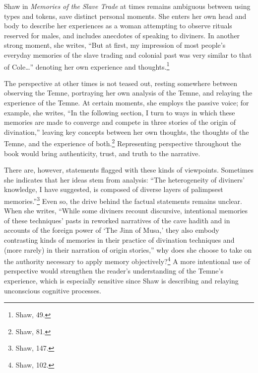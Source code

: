 Shaw in \emph{Memories of the Slave Trade} at times remains ambiguous
between using types and tokens, save distinct personal moments. She
enters her own head and body to describe her experiences as a woman
attempting to observe rituals reserved for males, and includes anecdotes
of speaking to diviners. In another strong moment, she writes, ``But at
first, my impression of most people's everyday memories of the slave
trading and colonial past was very similar to that of Cole\ldots''
denoting her own experience and thoughts.\footnote{Shaw, 49.}

The perspective at other times is not teased out, resting somewhere
between observing the Temne, portraying her own analysis of the Temne,
and relaying the experience of the Temne. At certain moments, she
employs the passive voice; for example, she writes, ``In the following
section, I turn to ways in which these memories are made to converge and
compete in three stories of the origin of divination,'' leaving key
concepts between her own thoughts, the thoughts of the Temne, and the
experience of both.\footnote{Shaw, 81.} Representing perspective
throughout the book would bring authenticity, trust, and truth to the
narrative.


There are, however, statements flagged with these kinds of viewpoints.
Sometimes she indicates that her ideas stem from analysis: ``The
heterogeneity of diviners' knowledge, I have suggested, is composed of
diverse layers of palimpsest memories.''\footnote{Shaw, 147.} Even so,
the drive behind the factual statements remains unclear. When she
writes, ``While some diviners recount discursive, intentional memories
of these techniques' pasts in reworked narratives of the cave hadith and
in accounts of the foreign power of `The Jinn of Musa,' they also embody
contrasting kinds of memories in their practice of divination techniques
and (more rarely) in their narration of origin stories,'' why does she
choose to take on the authority necessary to apply memory
objectively?\footnote{Shaw, 102.} A more intentional use of perspective
would strengthen the reader's understanding of the Temne's experience,
which is especially sensitive since Shaw is describing and relaying
unconscious cognitive processes.

